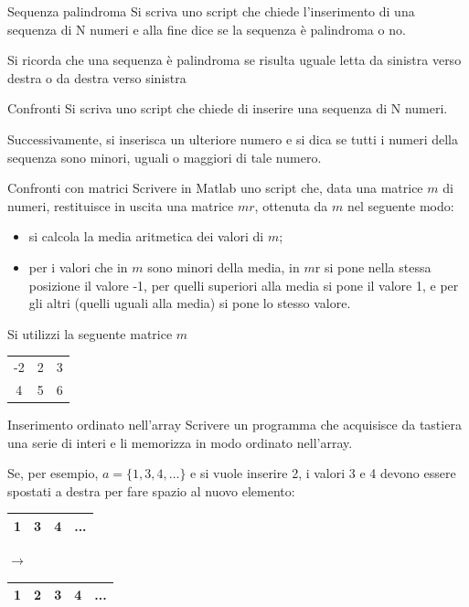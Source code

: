 \documentclass[format=169, handout]{beamer}
\begin{document}
\begin{frame}{Sequenza palindroma}
Si scriva uno script che chiede l’inserimento di una sequenza di N numeri e alla fine dice se la sequenza è palindroma o no.

Si ricorda che una sequenza è palindroma se risulta uguale letta da sinistra verso destra o da destra verso sinistra
\end{frame}

\begin{frame}{Confronti}
Si scriva uno script che chiede di inserire una sequenza di N numeri.

Successivamente, si inserisca un ulteriore numero e si dica se tutti i numeri della sequenza sono minori, uguali o maggiori di tale numero.
\end{frame}

\begin{frame}{Confronti con matrici}
Scrivere in Matlab uno script che, data una matrice $m$ di numeri, restituisce in uscita una matrice $mr$, ottenuta da $m$ nel seguente modo:
\begin{itemize}
	\item si calcola la media aritmetica dei valori di $m$;
	\item per i valori che in $m$ sono minori della media, in $m$r si
pone nella stessa posizione il valore -1, per quelli superiori alla media si pone il valore 1, e per gli altri (quelli uguali alla media) si pone lo stesso valore.
\end{itemize}

Si utilizzi la seguente matrice $m$

\centering
\begin{tabular}{|ccc|}
	\hline
	-2&2&3\\
	4&5&6\\
	\hline
\end{tabular}
\end{frame}

\begin{frame}{Inserimento ordinato nell'array}
Scrivere un programma che acquisisce da tastiera una serie di interi e li memorizza in modo ordinato nell'array.

\pause
Se, per esempio, $a = \{1, 3, 4, …\}$ e si vuole inserire 2, i valori 3 e 4 devono essere spostati a destra per fare spazio al nuovo elemento:

\centering
\begin{tabular}{|c|c|c|c|}
	\hline
	1&3&4&...\\
	\hline
\end{tabular}
$\rightarrow$
\begin{tabular}{|c|c|c|c|c|}
	\hline
	1& \alert{2} &3&4&...\\
	\hline
\end{tabular}
\end{frame}
\end{document}

